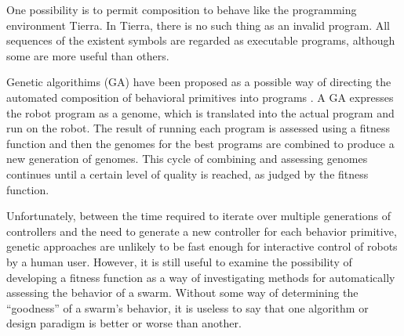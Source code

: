 \documentclass[]{article}
\begin{document}
One possibility is to permit composition to behave like the programming environment Tierra. \cite{ray1991approach}
In Tierra, there is no such thing as an invalid program. 
All sequences of the existent symbols are regarded as executable programs, although some are more useful than others. 

Genetic algorithims (GA) have been proposed as a possible way of directing the automated composition of behavioral primitives into programs \cite{palmer2005emergence}.
A GA expresses the robot program as a genome, which is translated into the actual program and run on the robot. 
The result of running each program is assessed using a fitness function and then the genomes for the best programs are combined to produce a new generation of genomes. 
This cycle of combining and assessing genomes continues until a certain level of quality is reached, as judged by the fitness function.

Unfortunately, between the time required to iterate over multiple generations of controllers and the need to generate a new controller for each behavior primitive, genetic approaches are unlikely to be fast enough for interactive control of robots by a human user. 
However, it is still useful to examine the possibility of developing a fitness function as a way of investigating methods for automatically assessing the behavior of a swarm.
Without some way of determining the ``goodness'' of a swarm's behavior, it is useless to say that one algorithm or design paradigm is better or worse than another. 
\end{document}
